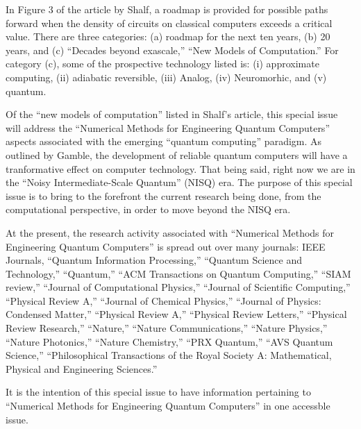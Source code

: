 \documentclass[]{article}
\begin{document}
In Figure 3 of the article by Shalf\cite{shalf2020future}, a roadmap is provided for possible paths forward when the density of circuits on classical computers exceeds a critical value.  There are three categories: (a) roadmap for the next ten years, (b) 20 years, and (c) ``Decades beyond exascale,'' ``New Models of Computation.'' For category (c), some of the prospective technology listed is:
(i) approximate computing, (ii) adiabatic reversible, (iii) Analog, (iv) Neuromorhic, and (v) quantum.

Of the ``new models of computation'' listed in 
Shalf's article\cite{shalf2020future}, this special issue will address
the ``Numerical Methods for Engineering Quantum Computers'' aspects associated with the
emerging ``quantum computing'' paradigm.  As outlined by
Gamble\cite{gamble2019quantum}, the development of reliable quantum
computers will have a tranformative effect on computer technology.  That being said, right now we are in the ``Noisy Intermediate-Scale Quantum''\cite{callison2022hybrid} (NISQ) era.  The purpose of this special issue is to bring to the forefront the current research being done, from the computational perspective, in order to move beyond the NISQ era.

At the present, the research activity associated with ``Numerical Methods for Engineering Quantum Computers''
is spread out over many journals: IEEE Journals, 
``Quantum Information Processing,'' 
``Quantum Science and Technology,'' 
``Quantum,'' 
``ACM Transactions on Quantum Computing,''
``SIAM review,''
``Journal of Computational Physics,''
``Journal of Scientific Computing,''
``Physical Review A,'' 
``Journal of Chemical Physics,'' 
``Journal of Physics: Condensed Matter,''
``Physical Review A,''
``Physical Review Letters,''
``Physical Review Research,''
``Nature,''
``Nature Communications,''
``Nature Physics,''
``Nature Photonics,''
``Nature Chemistry,''
``PRX Quantum,''
``AVS Quantum Science,''
``Philosophical Transactions of the Royal Society A: Mathematical, Physical and Engineering Sciences.''

It is the intention of this special issue to have information pertaining
to ``Numerical Methods for Engineering Quantum Computers'' in one accessble issue.
\end{document}
